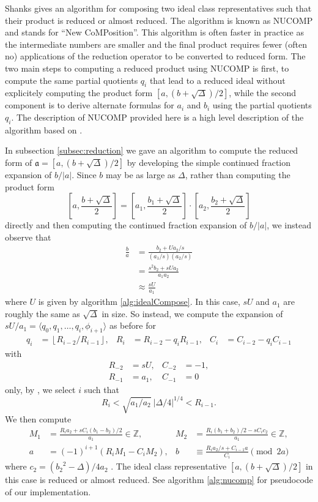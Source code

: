 \documentclass{ucalgthes1}
\theoremstyle{plain}
\theoremstyle{definition}
\newcommand{\ZZ}{\mathbb{Z}}
\newcommand{\floor}[1]{\left\lfloor #1 \right\rfloor}
\begin{document}
Shanks gives an algorithm for composing two ideal class representatives such that their product is reduced or almost reduced.  The algorithm is known as NUCOMP and stands for ``New CoMPosition''.  This algorithm is often faster in practice as the intermediate numbers are smaller and the final product requires fewer (often no) applications of the reduction operator to be converted to reduced form.  The two main steps to computing a reduced product using NUCOMP is first, to compute the same partial quotients $q_i$ that lead to a reduced ideal without explicitely computing the product form $[a,(b+\sqrt\Delta)/2]$, while the second component is to derive alternate formulas for $a_i$ and $b_i$ using the partial quotients $q_i$.  The description of NUCOMP provided here is a high level description of the algorithm based on \cite[pp.119-123]{Jac09}.

In subsection \ref{subsec:reduction} we gave an algorithm to compute the reduced form of \break$\mathfrak a = [a, (b+\sqrt\Delta)/2]$ by developing the simple continued fraction expansion of $b/|a|$.  Since $b$ may be as large as $\Delta$, rather than computing the product form
\[
	\left[a, \frac{b+\sqrt\Delta}{2} \right] = \left[a_1, \frac{b_1+\sqrt\Delta}{2} \right] \cdot \left[a_2, \frac{b_2+\sqrt\Delta}{2} \right]
\]
directly and then computing the continued fraction expansion of $b/|a|$, we instead observe that
\begin{align*}
	\frac{b}{a} &= \frac{b_2 + Ua_2/s}{(a_1/s)(a_2/s)} \\
	&= \frac{s^2 b_2+sUa_2}{a_1a_2} \\
	&\approx \frac{sU}{a_1}
\end{align*}
where $U$ is given by algorithm \ref{alg:idealCompose}.  In this case, $sU$ and $a_1$ are roughly the same as $\sqrt\Delta$ in size.  So instead, we compute the expansion of $sU/a_1 = \langle q_0, q_1, \dots, q_i, \phi_{i+1} \rangle$ as before for
\begin{align*}
	q_i &= \floor{R_{i-2} / R_{i-1}}, &
	R_i &= R_{i-2} - q_i R_{i-1}, &
	C_i &= C_{i-2} - q_i C_{i-1}
\end{align*}
with
\begin{align*}
	R_{-2} &= sU,  & C_{-2} &= -1, \\
	R_{-1} &= a_1, & C_{-1} &= 0
\end{align*}
only, by \cite[Theorem 5.43]{Jac09}, we select $i$ such that
\[
	R_i < \sqrt{a_1/a_2} ~ |\Delta/4|^{1/4} < R_{i-1}.
\]
We then compute
\begin{align*}
	M_1 &= \frac{R_i a_2 + sC_i(b_1-b_2)/2}{a_1}  \in \ZZ, &
	M_2 &= \frac{R_i (b_1+b_2)/2 - s C_i c_2}{a_1} \in \ZZ, \\
	a &= (-1)^{i+1} (R_i M_1  - C_i M_2), &
	b &\equiv \frac{R_i a_2 /s + C_{i-1} a}{C_i} \pmod{2a}
\end{align*}
where $c_2 = ({b_2}^2-\Delta)/4a_2$ \cite[Equation 5.44]{Jac09}.  The ideal class representative $[a, (b+\sqrt\Delta)/2]$ in this case is reduced or almost reduced.  See algorithm \ref{alg:nucomp} for pseudocode of our implementation.
\end{document}
